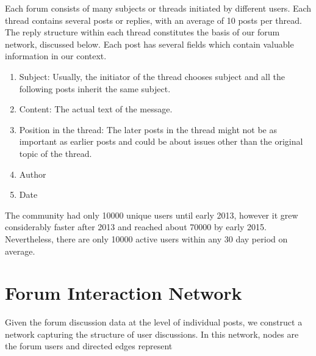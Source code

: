 Each forum consists of many subjects or threads initiated by different users.
Each thread contains several posts or replies, with an average of 10 posts per
thread.  The reply structure within each thread constitutes the basis of our
forum network, discussed below.  Each post has several fields which contain
valuable information in our context.
\begin{enumerate}
  \item{Subject:} Usually, the initiator of the thread chooses subject and all the
    following posts inherit the same subject.
  \item{Content:} The actual text of the message.
  \item{Position in the thread}: The later posts in the thread might not be as important
    as earlier posts and could be about issues other than the original topic of the thread.
  \item{Author}
  \item{Date}
\end{enumerate}

The community had only 10000 unique users until early 2013, however it grew considerably faster after 2013 and reached about 70000 by early 2015.
Nevertheless, there are only 10000 active users within any 30 day period on average.


\section{Forum Interaction Network}

Given the forum discussion data at the level of individual posts, we  construct a network capturing the structure of user discussions.
In this network, nodes are the forum users and directed edges represent 





